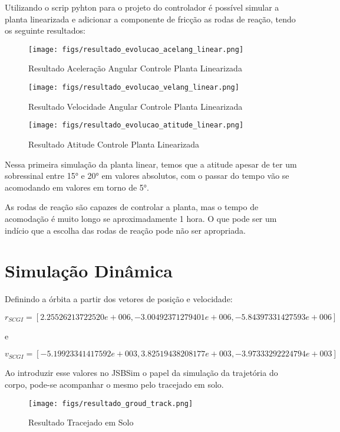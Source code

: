 Utilizando o scrip pyhton para o projeto do controlador é possível simular a planta linearizada e adicionar a componente de fricção as rodas de reação, tendo os seguinte resultados:


\begin{figure}[htpb]
	\centering
	\texttt{[image: figs/resultado\_evolucao\_acelang\_linear.png]}
	\caption{Resultado Aceleração Angular Controle Planta Linearizada}
	\label{fig:15}
\end{figure}

\begin{figure}[htpb]
	\centering
	\texttt{[image: figs/resultado\_evolucao\_velang\_linear.png]}
	\caption{Resultado Velocidade Angular Controle Planta Linearizada}
\label{fig:15}
\end{figure}

\begin{figure}[htpb]
	\centering
	\texttt{[image: figs/resultado\_evolucao\_atitude\_linear.png]}
	\caption{Resultado Atitude Controle Planta Linearizada}
	\label{fig:15}
\end{figure}

Nessa primeira simulação da planta linear, temos que a atitude apesar de ter um sobressinal entre 15° e 20° em valores absolutos, com o passar do tempo vão se acomodando em valores em torno de 5°.

As rodas de reação são capazes de controlar a planta, mas o tempo de acomodação é muito longo se aproximadamente 1 hora. O que pode ser um indício que a escolha das rodas de reação pode não ser apropriada.

\section{Simulação Dinâmica}

Definindo a órbita a partir dos vetores de posição e velocidade:

$r_{SCGI} = [2.25526213722520e+006, -3.00492371279401e+006, -5.84397331427593e+006]$

e

$v_{SCGI} = [-5.19923341417592e+003, 3.82519438208177e+003, -3.97333292224794e+003]$ 


Ao introduzir esse valores no JSBSim o papel da simulação da trajetória do corpo, pode-se acompanhar o mesmo pelo tracejado em solo.

\begin{figure}[htpb]
	\centering
	\texttt{[image: figs/resultado\_groud\_track.png]}
	\caption{Resultado Tracejado em Solo}
	\label{fig:15}
\end{figure}



